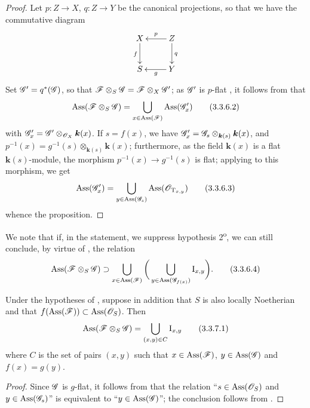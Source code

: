 \begin{proof}
Let $p:Z\to X$, $q:Z\to Y$ be the canonical projections, so that we have the commutative diagram
\[
\xymatrix{
X\ar[d]_{f} & Z\ar[l]_{p}\ar[d]^{q}\\
S & Y\ar[l]^{g}
}
\]
Set $\mathscr{G}'=q^*(\mathscr{G})$, so that $\mathscr{F}\otimes_S\mathscr{G}=\mathscr{F}\otimes_X\mathscr{G}'$; as $\mathscr{G}'$ is $p$-flat , it follows from  that
\[
\label{IV.3.3.6.2}
\operatorname{Ass}(\mathscr{F}\otimes_S\mathscr{G})=\bigcup_{x\in\operatorname{Ass}(\mathscr{F})}\operatorname{Ass}(\mathscr{G}'_x)
\tag{3.3.6.2}
\]
with $\mathscr{G}'_x=\mathscr{G}'\otimes_{\mathscr{O}_X}\boldsymbol{k}(x)$.
If $s=f(x)$, we have $\mathscr{G}'_x=\mathscr{G}_s\otimes_{\boldsymbol{k}(s)}\boldsymbol{k}(x)$, and $p^{-1}(x)=g^{-1}(s)\otimes_{\boldsymbol{k}(s)}\boldsymbol{k}(x)$; furthermore, as the field $\boldsymbol{k}(x)$ is a flat $\boldsymbol{k}(s)$-module, the morphism $p^{-1}(x)\to g^{-1}(s)$ is flat; applying  to this morphism, we get
\[
\label{IV.3.3.6.3}
\operatorname{Ass}(\mathscr{G}'_x)=\bigcup_{y\in\operatorname{Ass}(\mathscr{G}_s)}\operatorname{Ass}(\mathscr{O}_{\mathrm{T}_{x,y}})
\tag{3.3.6.3}
\]
whence the proposition.
\end{proof}

We note that if, in the statement, we suppress hypothesis 2\textsuperscript{o}, we can still conclude, by virtue of , the relation
\[
\label{IV.3.3.6.4}
\operatorname{Ass}(\mathscr{F}\otimes_S\mathscr{G})\supset\bigcup_{x\in\operatorname{Ass}(\mathscr{F})}\bigg(\bigcup_{y\in\operatorname{Ass}(\mathscr{G}_{f(x)})}\mathrm{I}_{x,y}\bigg).
\tag{3.3.6.4}
\]

\begin{corollary}[3.3.7]
\label{IV.3.3.7}
Under the hypotheses of , suppose in addition that $S$ is also locally Noetherian and that $f(\operatorname{Ass}(\mathscr{F}))\subset\operatorname{Ass}(\mathscr{O}_S)$.
Then
\[
\label{IV.3.3.7.1}
\operatorname{Ass}(\mathscr{F}\otimes_S\mathscr{G})=\bigcup_{(x,y)\in C}\mathrm{I}_{x,y}
\tag{3.3.7.1}
\]
where $C$ is the set of pairs $(x,y)$ such that $x\in\operatorname{Ass}(\mathscr{F})$, $y\in\operatorname{Ass}(\mathscr{G})$ and $f(x)=g(y)$.
\end{corollary}

\begin{proof}
Since $\mathscr{G}$ is $g$-flat, it follows from  that the relation
``$s\in\operatorname{Ass}(\mathscr{O}_S)$ and $y\in\operatorname{Ass}(\mathscr{G}_s)$''
is equivalent to ``$y\in\operatorname{Ass}(\mathscr{G})$''; the conclusion follows from .
\end{proof}

